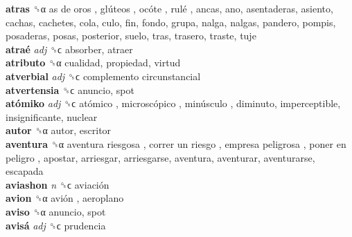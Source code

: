 \textbf{atras} ␝α   as de oros ,  glúteos ,  ocóte ,  rulé , ancas, ano, asentaderas, asiento, cachas, cachetes, cola, culo, fin, fondo, grupa, nalga, nalgas, pandero, pompis, posaderas, posas, posterior, suelo, tras, trasero, traste, tuje  \\
\textbf{atraé} \emph{adj}  ␝ϲ  absorber, atraer  \\
\textbf{atributo} ␝α  cualidad, propiedad, virtud  \\
\textbf{atverbial} \emph{adj}  ␝ϲ   complemento circunstancial   \\
\textbf{atvertensia} ␝ϲ  anuncio, spot  \\
\textbf{atómiko} \emph{adj}  ␝ϲ   atómico ,  microscópico ,  minúsculo , diminuto, imperceptible, insignificante, nuclear  \\
\textbf{autor} ␝α  autor, escritor  \\
\textbf{aventura} ␝α   aventura riesgosa ,  correr un riesgo ,  empresa peligrosa ,  poner en peligro , apostar, arriesgar, arriesgarse, aventura, aventurar, aventurarse, escapada  \\
\textbf{aviashon} \emph{n}  ␝ϲ   aviación   \\
\textbf{avion} ␝α   avión , aeroplano  \\
\textbf{aviso} ␝α  anuncio, spot  \\
\textbf{avisá} \emph{adj}  ␝ϲ  prudencia  \\
